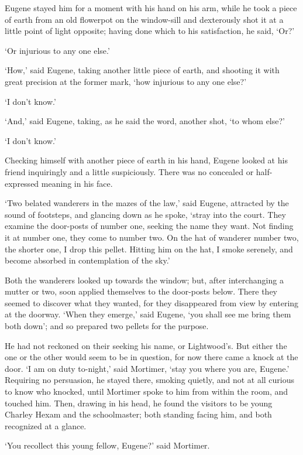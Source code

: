 Eugene stayed him for a moment with his hand on his arm, while he took a
piece of earth from an old flowerpot on the window-sill and dexterously
shot it at a little point of light opposite; having done which to his
satisfaction, he said, ‘Or?’

‘Or injurious to any one else.’

‘How,’ said Eugene, taking another little piece of earth, and shooting
it with great precision at the former mark, ‘how injurious to any one
else?’

‘I don’t know.’

‘And,’ said Eugene, taking, as he said the word, another shot, ‘to whom
else?’

‘I don’t know.’

Checking himself with another piece of earth in his hand, Eugene looked
at his friend inquiringly and a little suspiciously. There was no
concealed or half-expressed meaning in his face.

‘Two belated wanderers in the mazes of the law,’ said Eugene, attracted
by the sound of footsteps, and glancing down as he spoke, ‘stray into
the court. They examine the door-posts of number one, seeking the name
they want. Not finding it at number one, they come to number two. On the
hat of wanderer number two, the shorter one, I drop this pellet. Hitting
him on the hat, I smoke serenely, and become absorbed in contemplation
of the sky.’

Both the wanderers looked up towards the window; but, after
interchanging a mutter or two, soon applied themselves to the door-posts
below. There they seemed to discover what they wanted, for they
disappeared from view by entering at the doorway. ‘When they emerge,’
said Eugene, ‘you shall see me bring them both down’; and so prepared
two pellets for the purpose.

He had not reckoned on their seeking his name, or Lightwood’s. But
either the one or the other would seem to be in question, for now there
came a knock at the door. ‘I am on duty to-night,’ said Mortimer, ‘stay
you where you are, Eugene.’ Requiring no persuasion, he stayed there,
smoking quietly, and not at all curious to know who knocked, until
Mortimer spoke to him from within the room, and touched him. Then,
drawing in his head, he found the visitors to be young Charley Hexam
and the schoolmaster; both standing facing him, and both recognized at a
glance.

‘You recollect this young fellow, Eugene?’ said Mortimer.

